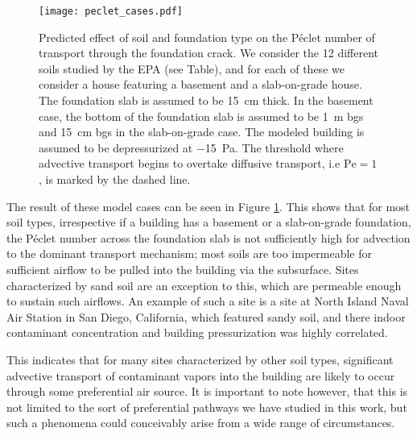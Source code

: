 \begin{figure}[htb!]
  \centering
  \texttt{[image: peclet\_cases.pdf]}
  \caption{Predicted effect of soil and foundation type on the Péclet number of transport through the foundation crack. We consider the 12 different soils studied by the EPA (see Table), and for each of these we consider a house featuring a basement and a slab-on-grade house. The foundation slab is assumed to be \SI{15}{\centi\metre} thick. In the basement case, the bottom of the foundation slab is assumed to be \SI{1}{\metre} bgs and \SI{15}{\centi\metre} bgs in the slab-on-grade case. The modeled building is assumed to be depressurized at \SI{-15}{\pascal}. The threshold where advective transport begins to overtake diffusive transport, i.e $\mathrm{Pe}=1$, is marked by the dashed line.}
  \label{fig:peclet_soil_foundation_type}
\end{figure}

The result of these model cases can be seen in Figure \ref{fig:peclet_soil_foundation_type}.
This shows that for most soil types, irrespective if a building has a basement or a slab-on-grade foundation, the Péclet number across the foundation slab is not sufficiently high for advection to the dominant transport mechanism; most soils are too impermeable for sufficient airflow to be pulled into the building via the subsurface.
Sites characterized by sand soil are an exception to this, which are permeable enough to sustain such airflows.
An example of such a site is a site at North Island Naval Air Station in San Diego, California, which featured sandy soil, and there indoor contaminant concentration and building pressurization was highly correlated\cite{hosangadi_high-frequency_2017}.\par

This indicates that for many sites characterized by other soil types, significant advective transport of contaminant vapors into the building are likely to occur through some preferential air source.
It is important to note however, that this is not limited to the sort of preferential pathways we have studied in this work, but such a phenomena could conceivably arise from a wide range of circumstances.\par
